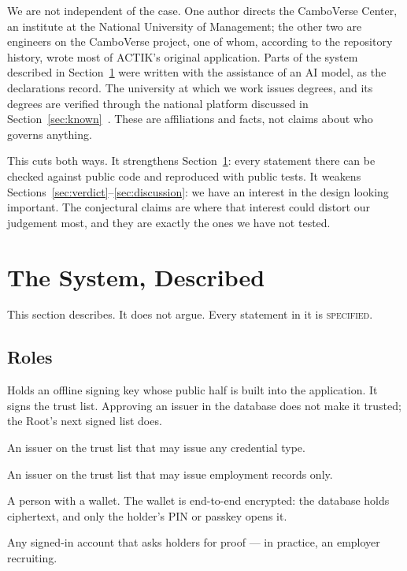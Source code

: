 \documentclass[10pt,a4paper,twocolumn]{article}
\newcommand{\kind}[1]{\textsc{#1}}
\begin{document}
We are not independent of the case. One author directs the CamboVerse Center, an
institute at the National University of Management; the other two are engineers
on the CamboVerse project, one of whom, according to the repository history, wrote
most of ACTIK's original application. Parts of the system described in
Section~\ref{sec:system} were written with the assistance of an AI model, as the
declarations record. The university at which we work issues degrees, and its
degrees are verified through the national platform discussed in
Section~\ref{sec:known}~\citep{khmertimes2026verifygov}. These are affiliations
and facts, not claims about who governs anything.

This cuts both ways. It strengthens Section~\ref{sec:system}: every statement
there can be checked against public code and reproduced with public tests. It
weakens Sections~\ref{sec:verdict}--\ref{sec:discussion}: we have an interest in
the design looking important. The conjectural claims are where that interest
could distort our judgement most, and they are exactly the ones we have not
tested.

\section{The System, Described}
\label{sec:system}

This section describes. It does not argue. Every statement in it is
\kind{specified}.

\subsection{Roles}

\begin{description}[leftmargin=0pt,itemsep=2pt]
\item[Root.] Holds an offline signing key whose public half is built into the
application. It signs the trust list. Approving an issuer in the database does
not make it trusted; the Root's next signed list does.
\item[Accredited institution.] An issuer on the trust list that may issue any
credential type.
\item[Registered employer.] An issuer on the trust list that may issue
employment records only.
\item[Holder.] A person with a wallet. The wallet is end-to-end encrypted: the
database holds ciphertext, and only the holder's PIN or passkey opens it.
\item[Requester.] Any signed-in account that asks holders for proof --- in
practice, an employer recruiting.
\end{description}
\end{document}
